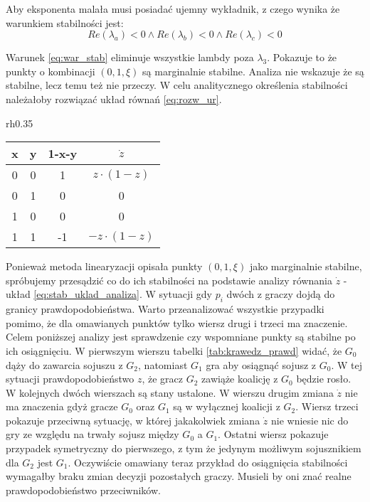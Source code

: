 Aby eksponenta malała musi posiadać ujemny wykładnik, z czego wynika że warunkiem stabilności jest:
\begin{equation}\label{eq:war_stab}
Re(\lambda_a)<0 \wedge Re(\lambda_b)<0 \wedge Re(\lambda_c)<0
\end{equation}

Warunek \ref{eq:war_stab} eliminuje wszystkie lambdy poza $\lambda_3$. Pokazuje to że punkty o kombinacji $(0,1,\xi)$ są marginalnie stabilne. Analiza nie wskazuje że są stabilne, lecz temu też nie przeczy. W celu analitycznego określenia stabilności należałoby rozwiązać układ równań \ref{eq:rozw_ur}.

\begin{wraptable}{rh}{0.35\textwidth}
    \centering
    \caption{Stabilność na krawędzi sześcianu}
\label{tab:krawedz_prawd}
\begin{tabular}{c|c|c|c}
x & y & 1-x-y & $\dot{z}$       \\ \hline 
0 & 0 & 1     & $z \cdot (1-z)$  \\
0 & 1 & 0     & 0                \\
1 & 0 & 0     & 0                \\
1 & 1 & -1    & $-z \cdot (1-z)$
\end{tabular}
\end{wraptable}

Ponieważ metoda linearyzacji opisała punkty $(0,1,\xi)$ jako marginalnie stabilne, spróbujemy przesądzić co do ich stabilności na podstawie analizy równania $\dot{z}$ - układ \ref{eq:stab_uklad_analiza}. W sytuacji gdy $p_i$ dwóch z graczy dojdą do granicy prawdopodobieństwa. Warto przeanalizować wszystkie przypadki pomimo, że dla omawianych punktów tylko wiersz drugi i trzeci ma znaczenie. Celem poniższej analizy jest sprawdzenie czy wspomniane punkty są stabilne po ich osiągnięciu.
W pierwszym wierszu tabelki \ref{tab:krawedz_prawd} widać, że $G_0$ dąży do zawarcia sojuszu z $G_2$, natomiast $G_1$ gra aby osiągnąć sojusz z $G_0$. W tej sytuacji prawdopodobieństwo $z$, że gracz $G_2$ zawiąże koalicję z $G_0$ będzie rosło. W kolejnych dwóch wierszach są stany ustalone. W wierszu drugim zmiana $\dot{z}$ nie ma znaczenia gdyż gracze $G_0$ oraz $G_1$ są w wyłącznej koalicji z $G_2$. Wiersz trzeci pokazuje przeciwną sytuację, w której jakakolwiek zmiana $\dot{z}$ nie wniesie nic do gry ze względu na trwały sojusz między $G_0$ a $G_1$. Ostatni wiersz pokazuje przypadek symetryczny do pierwszego, z tym że jedynym możliwym sojusznikiem dla $G_2$ jest $G_1$. Oczywiście omawiany teraz przykład do osiągnięcia stabilności wymagałby braku zmian decyzji pozostałych graczy. Musieli by oni znać realne prawdopodobieństwo przeciwników.